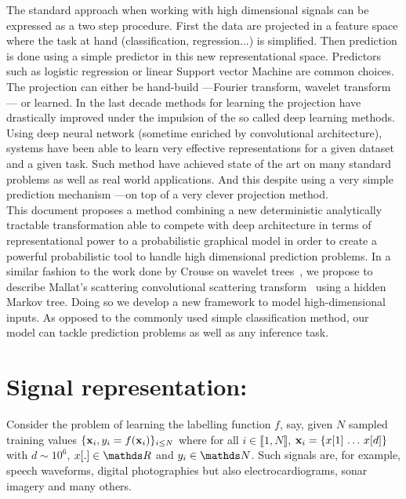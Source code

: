 \documentclass[a4paper,11pt]{report}
\begin{document}
	The standard approach when working with high dimensional signals can be expressed as a two step procedure. First the data are projected in a feature space where the task at hand (classification, regression...) is simplified. Then prediction is done using a simple predictor in this new representational space. Predictors such as logistic regression or linear Support vector Machine are common choices. The projection can either be hand-build ---\eg Fourier transform, wavelet transform--- or learned. In the last decade methods for learning the projection have drastically improved under the impulsion of the so called deep learning methods. Using deep neural network (sometime enriched by convolutional architecture), systems have been able to learn very effective representations for a given dataset and a given task. Such method have achieved state of the art on many standard problems as well as real world applications. And this despite using a very simple prediction mechanism ---on top of a very clever projection method.\\
	
	This document proposes a method combining a new deterministic analytically tractable transformation able to compete with deep architecture in terms of representational power to a probabilistic graphical model in order to create a powerful probabilistic tool to handle high dimensional prediction problems. In a similar fashion to the work done by Crouse on wavelet trees~\citep{crouse1998wavelet}, we propose to describe Mallat's scattering convolutional scattering transform~\citep{bruna2010classification} using a hidden Markov tree. Doing so we develop a new framework to model high-dimensional inputs. As opposed to the commonly used simple classification method, our model can tackle prediction problems as well as any inference task.
	
	\section{Signal representation:}
		\label{sec:Intro/Need}
		
		Consider the problem of learning the labelling function $f$, say, given $N$ sampled training values $\{{\bf x}_{i}, y_{i}=f({\bf x}_{i})\}_{i\leq N}$ where  for all $i \in \llbracket 1 , N \rrbracket$, ${\bf x}_{i} =\{ x[1] \, \dots \, x[d] \}$ with $d \sim 10^{6}$, $x[.] \in \dsR$ and $y_{i} \in \dsN$. Such signals are, for example, speech waveforms, digital photographies but also electrocardiograms, sonar imagery and many others.\\
\end{document}
